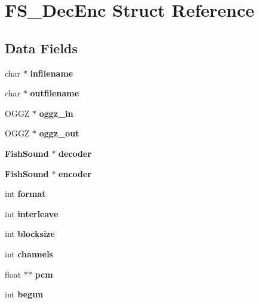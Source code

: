 \section{F\-S\-\_\-\-Dec\-Enc Struct Reference}
\label{structFS__DecEnc}
\subsection*{Data Fields}
\begin{DoxyCompactItemize}
\item 
char $\ast$ {\bfseries infilename}\label{structFS__DecEnc_a2d504fd84cb7ed0e37f8426d54604bc6}

\item 
char $\ast$ {\bfseries outfilename}\label{structFS__DecEnc_a8c5d866d2d7eae7b06284a7eb090872a}

\item 
O\-G\-G\-Z $\ast$ {\bfseries oggz\-\_\-in}\label{structFS__DecEnc_ab2c10caaf9504ca316f961227035a65f}

\item 
O\-G\-G\-Z $\ast$ {\bfseries oggz\-\_\-out}\label{structFS__DecEnc_ac67d216f68cd4b5b8047f4bfbca59954}

\item 
{\bf Fish\-Sound} $\ast$ {\bfseries decoder}\label{structFS__DecEnc_a4110f95fd7bd1d525240340c56d5edba}

\item 
{\bf Fish\-Sound} $\ast$ {\bfseries encoder}\label{structFS__DecEnc_a45453cc1286e459865881ca52fb50b72}

\item 
int {\bfseries format}\label{structFS__DecEnc_a5cf3da44e41bc3e5a1a06613cc47f5d2}

\item 
int {\bfseries interleave}\label{structFS__DecEnc_ac0659a7bb25d60473ca9192508abc1a0}

\item 
int {\bfseries blocksize}\label{structFS__DecEnc_afd37425c29c3b12cccf0d03d248dd27e}

\item 
int {\bfseries channels}\label{structFS__DecEnc_a33cc7d9c2cf0eb60d508b2201243729d}

\item 
float $\ast$$\ast$ {\bfseries pcm}\label{structFS__DecEnc_acd8b8ef826db6fd6ec2a9f9fb4f2a42c}

\item 
int {\bfseries begun}\label{structFS__DecEnc_a206983f5ec9f76a6948ee2de26f9de8d}


\end{DoxyCompactItemize}
